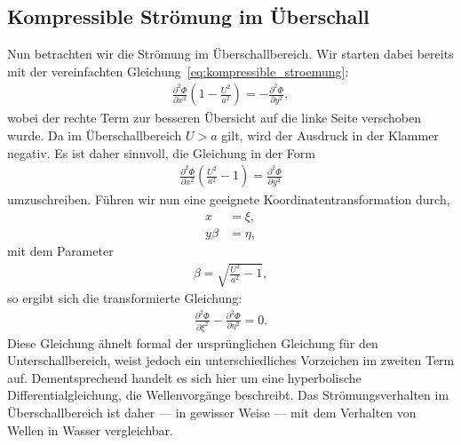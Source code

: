 \subsection{Kompressible Strömung im Überschall}
Nun betrachten wir die Strömung im Überschallbereich.
Wir starten dabei bereits mit der vereinfachten 
Gleichung~\eqref{eq:kompressible_stroemung}:
\begin{align*}
    \frac{\partial^2 \Phi}{\partial x^2}
    \left(1 - \frac{U^2}{a^2}\right)
    =
    -\frac{\partial^2 \Phi}{\partial y^2},
\end{align*}
wobei der rechte Term zur besseren Übersicht auf die 
linke Seite verschoben wurde.
Da im Überschallbereich $U > a$ gilt, wird der Ausdruck 
in der Klammer negativ.
Es ist daher sinnvoll, die Gleichung in der Form
\begin{align*}
    \frac{\partial^2 \Phi}{\partial x^2}
    \left(\frac{U^2}{a^2} - 1\right)
    =
    \frac{\partial^2 \Phi}{\partial y^2}
\end{align*}
umzuschreiben.
Führen wir nun eine geeignete Koordinatentransformation durch,
\begin{align*}
    x 
    &= 
    \xi, \\
    y \beta 
    &= 
    \eta,
\end{align*}
mit dem Parameter
\begin{align*}
    \beta = \sqrt{\frac{U^2}{a^2} - 1},
\end{align*}
so ergibt sich die transformierte Gleichung:
\begin{align}
    \frac{\partial^2 \Phi}{\partial \xi^2}
    -
    \frac{\partial^2 \Phi}{\partial \eta^2}
    =
    0.\label{eq:wellengl_ueberschall}
\end{align}
Diese Gleichung ähnelt formal der ursprünglichen Gleichung 
für den Unterschallbereich, weist jedoch ein 
unterschiedliches Vorzeichen im zweiten Term auf.
Dementsprechend handelt es sich hier um eine hyperbolische 
Differentialgleichung, die Wellenvorgänge beschreibt.
Das Strömungsverhalten im Überschallbereich ist daher — 
in gewisser Weise — mit dem Verhalten von Wellen in Wasser vergleichbar.

